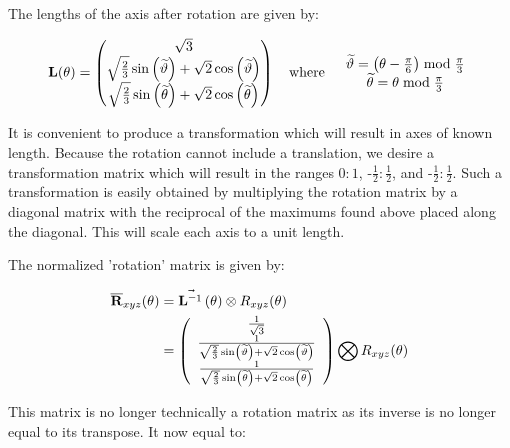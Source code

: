 The lengths of the axis after rotation are given by:

\begin{equation}\label{eq:L}
\mathbf{L}(\theta) =
\begin{pmatrix}
\sqrt{3} \\
 \sqrt{\frac{2}{3}} \sin \left(\widetilde{\vartheta}\right) + \sqrt{2} \cos \left(\widetilde{\vartheta}\right) \\  
\sqrt{\frac{2}{3}} \sin \left(\widetilde{\theta}\right) + \sqrt{2} \cos \left(\widetilde{\theta}\right) 
\end{pmatrix}
\quad \text{where}  \quad 
\begin{array}{c}
\widetilde{\vartheta} = \left(\theta - \frac{\pi}{6}\right) \bmod \frac{\pi }{3} \\
\widetilde{\theta} = \theta  \bmod \frac{\pi }{3} 
\end{array}
\end{equation}

It is convenient to produce a transformation which will result in axes of known length. Because the rotation cannot include a translation, we desire a transformation matrix which will result in the ranges $0:1$, -$\frac{1}2:\frac{1}2$, and -$\frac{1}2:\frac{1}2$. Such a transformation is easily obtained by multiplying the rotation matrix by a diagonal matrix with the reciprocal of the maximums found above placed along the diagonal. This will scale each axis to a unit length.

The normalized 'rotation' matrix is given by:


\begin{align}\label{eq:NormRxyz3}
 \overline{\R}_{xyz}(\theta) &= \nS[\theta] \otimes R_{xyz}(\theta) \\
&=\left(
\begin{array}{c}
 \frac{1}{\sqrt{3}}  \\
 \frac{1}{\sqrt{\frac{2}{3}} \sin \left(\widetilde{\vartheta}\right) + \sqrt{2} \cos \left(\widetilde{\vartheta}\right)} \\
 \frac{1}{\sqrt{\frac{2}{3}} \sin \left(\widetilde{\theta}\right) + \sqrt{2} \cos \left(\widetilde{\theta}\right)  }  \\
\end{array}
\right)
\bigotimes
R_{xyz}(\theta)
\end{align}

This matrix is no longer technically a rotation matrix as its inverse is no longer equal to its transpose. It now equal to:

